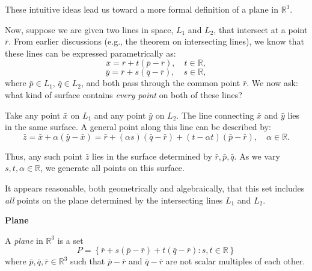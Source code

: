 \begin{itemize}
\end{itemize}

\newpage

These intuitive ideas lead us toward a more formal definition of a plane in $\mathbb{R}^3$.

Now, suppose we are given two lines in space, $L_1$ and $L_2$, that intersect at a point $\bar{r}$. From earlier discussions (e.g., the theorem on intersecting lines), we know that these lines can be expressed parametrically as:
\[
\bar{x} = \bar{r} + t(\bar{p} - \bar{r}), \quad t \in \mathbb{R},
\]
\[
\bar{y} = \bar{r} + s(\bar{q} - \bar{r}), \quad s \in \mathbb{R},
\]
where $\bar{p} \in L_1$, $\bar{q} \in L_2$, and both pass through the common point $\bar{r}$. We now ask: what kind of surface contains \emph{every point} on both of these lines?

Take any point $\bar{x}$ on $L_1$ and any point $\bar{y}$ on $L_2$. The line connecting $\bar{x}$ and $\bar{y}$ lies in the same surface. A general point along this line can be described by:
\[
\bar{z} = \bar{x} + \alpha(\bar{y} - \bar{x}) = \bar{r} + (\alpha s)(\bar{q} - \bar{r}) + (t - \alpha t)(\bar{p} - \bar{r}), \quad \alpha \in \mathbb{R}.
\]

Thus, any such point $\bar{z}$ lies in the surface determined by $\bar{r}, \bar{p}, \bar{q}$. As we vary $s, t, \alpha \in \mathbb{R}$, we generate all points on this surface.

It appears reasonable, both geometrically and algebraically, that this set includes \emph{all} points on the plane determined by the intersecting lines $L_1$ and $L_2$.

\begin{definitionbox}

\textbf{Plane}

A \textit{plane} in \( \mathbb{R}^3 \) is a set
\[
P = \left\{ \bar{r} + s(\bar{p} - \bar{r}) + t(\bar{q} - \bar{r}) : s, t \in \mathbb{R} \right\}
\]
where \( \bar{p}, \bar{q}, \bar{r} \in \mathbb{R}^3 \) such that \( \bar{p} - \bar{r} \) and \( \bar{q} - \bar{r} \) are not scalar multiples of each other.
\end{definitionbox}

